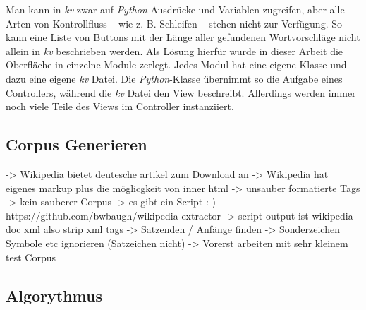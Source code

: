         Man kann in \emph{kv} zwar auf \emph{Python}-Ausdrücke und Variablen zugreifen, aber alle Arten von Kontrollfluss  – wie z. B. Schleifen – stehen nicht zur Verfügung. So kann eine Liste von Buttons mit der Länge aller gefundenen Wortvorschläge nicht allein in \emph{kv} beschrieben werden. Als Lösung hierfür wurde in dieser Arbeit die Oberfläche in einzelne Module zerlegt. Jedes Modul hat eine eigene Klasse und dazu eine eigene \emph{kv} Datei. Die \emph{Python}-Klasse übernimmt so die Aufgabe eines Controllers, während die \emph{kv} Datei den View beschreibt. Allerdings werden immer noch viele Teile des Views im Controller instanziiert.
        
	\newpage
    \subsection{Corpus Generieren}
    	-> Wikipedia bietet deutesche artikel zum Download an
        -> Wikipedia hat eigenes markup plus die möglicgkeit von inner html
        -> unsauber formatierte Tags -> kein sauberer Corpus
        -> es gibt ein Script :-) https://github.com/bwbaugh/wikipedia-extractor
        -> script output ist wikipedia doc xml also strip xml tags 
        -> Satzenden / Anfänge finden
        -> Sonderzeichen Symbole etc ignorieren (Satzeichen nicht)
        -> Vorerst arbeiten mit sehr kleinem test Corpus
        
	\subsection{Algorythmus}
    \newpage